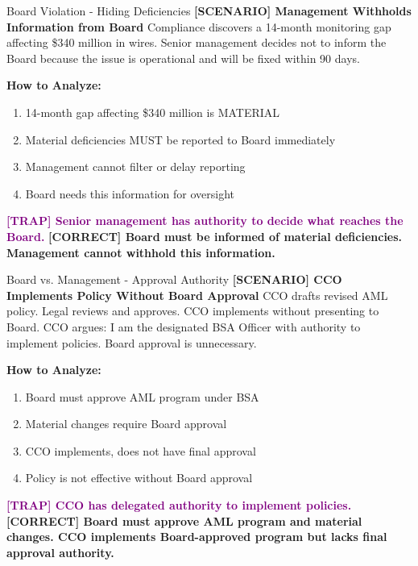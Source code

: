 \documentclass[11pt,a4paper]{beamer}
\newcommand{\trap}[1]{\textcolor{purple}{\textbf{[TRAP] #1}}}
\newcommand{\correct}[1]{\textcolor{green!50!black}{\textbf{[CORRECT] #1}}}
\newcommand{\scenario}[1]{\textcolor{blue!70!black}{\textbf{[SCENARIO] #1}}}
\begin{document}
	\begin{frame}{Board Violation - Hiding Deficiencies}
		\scenario{Management Withholds Information from Board}
		Compliance discovers a 14-month monitoring gap affecting \$340 million in wires. Senior management decides not to inform the Board because the issue is operational and will be fixed within 90 days.
		
		\vspace{0.1cm}
		\textbf{How to Analyze:}
		\begin{enumerate}
			\item 14-month gap affecting \$340 million is MATERIAL
			\item Material deficiencies MUST be reported to Board immediately
			\item Management cannot filter or delay reporting
			\item Board needs this information for oversight
		\end{enumerate}
		\trap{Senior management has authority to decide what reaches the Board.}
		\correct{Board must be informed of material deficiencies. Management cannot withhold this information.}
	\end{frame}
	
	\begin{frame}{Board vs. Management - Approval Authority}
		\scenario{CCO Implements Policy Without Board Approval}
		CCO drafts revised AML policy. Legal reviews and approves. CCO implements without presenting to Board. CCO argues: I am the designated BSA Officer with authority to implement policies. Board approval is unnecessary.
		
		\vspace{0.1cm}
		\textbf{How to Analyze:}
		\begin{enumerate}
			\item Board must approve AML program under BSA
			\item Material changes require Board approval
			\item CCO implements, does not have final approval
			\item Policy is not effective without Board approval
		\end{enumerate}
		\trap{CCO has delegated authority to implement policies.}
		\correct{Board must approve AML program and material changes. CCO implements Board-approved program but lacks final approval authority.}
	\end{frame}
	
\end{document}
